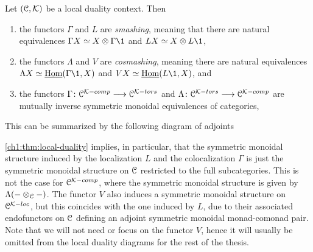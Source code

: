 \begin{theorem}
    \label{ch1:thm:local-duality}
    Let $(\EuScript{C}, \mathcal{K})$ be a local duality context. Then
    \begin{enumerate}
        \item the functors $\Gamma$ and $L$ are \emph{smashing}, meaning that there are natural equivalences $\Gamma X\simeq X\otimes \Gamma \1$ and $LX\simeq X\otimes L\1$,
        \item the functors $\Lambda$ and $V$ are \emph{cosmashing}, meaning there are natural equivalences $\Lambda X\simeq \iHom(\Gamma \1,X)$ and $VX\simeq \iHom(L\1, X)$, and 
        \item the functors $\Gamma\colon \EuScript{C}^{\mathcal{K}-comp}\longrightarrow \EuScript{C}^{\mathcal{K}-tors}$ and $\Lambda\colon \EuScript{C}^{\mathcal{K}-tors}\longrightarrow \EuScript{C}^{\mathcal{K}-comp}$ are mutually inverse symmetric monoidal equivalences of categories,
    \end{enumerate}
    This can be summarized by the following diagram of adjoints
    \begin{center}
    \end{center}
\end{theorem}

\begin{remark}
    \label{ch1:rm:monoidal-structure-in-local-duality}
    \cref{ch1:thm:local-duality} implies, in particular, that the symmetric monoidal structure induced by the localization $L$ and the colocalization $\Gamma$ is just the symmetric monoidal structure on $\EuScript{C}$ restricted to the full subcategories. This is not the case for $\EuScript{C}^{\mathcal{K}-comp}$, where the symmetric monoidal structure is given by $\Lambda(-\otimes_{\EuScript{C}}-)$. The functor $V$ also induces a symmetric monoidal structure on $\EuScript{C}^{\mathcal{K}-loc}$, but this coincides with the one induced by $L$, due to their associated endofunctors on $\EuScript{C}$ defining an adjoint symmetric monoidal monad-comonad pair. Note that we will not need or focus on the functor $V$, hence it will usually be omitted from the local duality diagrams for the rest of the thesis. 
\end{remark}

